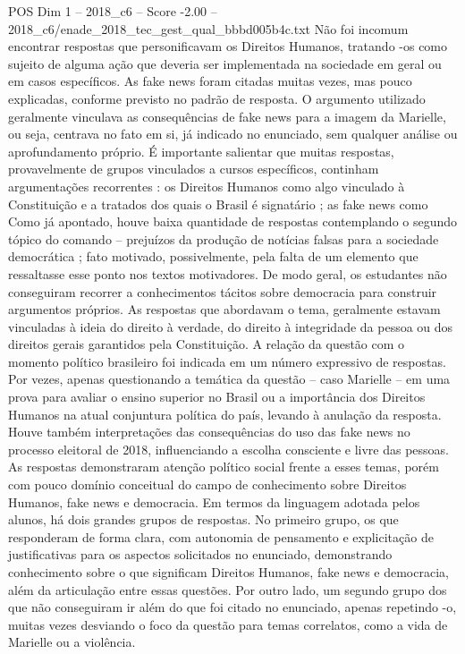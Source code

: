 \begin{textsample}{POS Dim 1 – 2018\_c6 – Score -2.00 – 2018\_c6/enade\_2018\_tec\_gest\_qual\_bbbd005b4c.txt}
Não foi incomum encontrar respostas que personificavam os Direitos Humanos, tratando -os como sujeito de alguma ação que deveria ser implementada na sociedade em geral ou em casos específicos.
As fake news foram citadas muitas vezes, mas pouco explicadas, conforme previsto no padrão de resposta.
O argumento utilizado geralmente vinculava as consequências de fake news para a imagem da Marielle, ou seja, centrava no fato em si, já indicado no enunciado, sem qualquer análise ou aprofundamento próprio.
É importante salientar que muitas respostas, provavelmente de grupos vinculados a cursos específicos, continham argumentações recorrentes : os Direitos Humanos como algo vinculado à Constituição e a tratados dos quais o Brasil é signatário ; as fake news como Como já apontado, houve baixa quantidade de respostas contemplando o segundo tópico do comando – prejuízos da produção de notícias falsas para a sociedade democrática ; fato motivado, possivelmente, pela falta de um elemento que ressaltasse esse ponto nos textos motivadores.
De modo geral, os estudantes não conseguiram recorrer a conhecimentos tácitos sobre democracia para construir argumentos próprios.
As respostas que abordavam o tema, geralmente estavam vinculadas à ideia do direito à verdade, do direito à integridade da pessoa ou dos direitos gerais garantidos pela Constituição.
A relação da questão com o momento político brasileiro foi indicada em um número expressivo de respostas.
Por vezes, apenas questionando a temática da questão – caso Marielle – em uma prova para avaliar o ensino superior no Brasil ou a importância dos Direitos Humanos na atual conjuntura política do país, levando à anulação da resposta.
Houve também interpretações das consequências do uso das fake news no processo eleitoral de 2018, influenciando a escolha consciente e livre das pessoas.
As respostas demonstraram atenção político social frente a esses temas, porém com pouco domínio conceitual do campo de conhecimento sobre Direitos Humanos, fake news e democracia.
Em termos da linguagem adotada pelos alunos, há dois grandes grupos de respostas.
No primeiro grupo, os que responderam de forma clara, com autonomia de pensamento e explicitação de justificativas para os aspectos solicitados no enunciado, demonstrando conhecimento sobre o que significam Direitos Humanos, fake news e democracia, além da articulação entre essas questões.
Por outro lado, um segundo grupo dos que não conseguiram ir além do que foi citado no enunciado, apenas repetindo -o, muitas vezes desviando o foco da questão para temas correlatos, como a vida de Marielle ou a violência.

\end{textsample}

